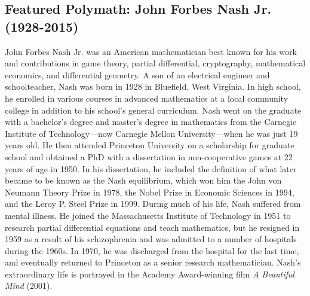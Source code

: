 \documentclass[12pt]{article}
\theoremstyle{definition}
\begin{document}
\subsection*{Featured Polymath: John Forbes Nash Jr. (1928-2015)}
John Forbes Nash Jr. was an American mathematician best known for his work and contributions in game theory, partial differential, cryptography, mathematical economics, and differential geometry. A son of an electrical engineer and schoolteacher, Nash was born in 1928 in Bluefield, West Virginia. In high school, he enrolled in various courses in advanced mathematics at a local community college in addition to his school’s general curriculum. Nash went on the graduate with a bachelor’s degree and master’s degree in mathematics from the Carnegie Institute of Technology—now Carnegie Mellon University—when he was just 19 years old. He then attended Princeton University on a scholarship for graduate school and obtained a PhD with a dissertation in non-cooperative games at 22 years of age in 1950. In his dissertation, he included the definition of what later became to be known as the Nash equilibrium, which won him the John von Neumann Theory Prize in 1978, the Nobel Prize in Economic Sciences in 1994, and the Leroy P. Steel Prize in 1999. During much of his life, Nash suffered from mental illness. He joined the Massachusetts Institute of Technology in 1951 to research partial differential equations and teach mathematics, but he resigned in 1959 as a result of his schizophrenia and was admitted to a number of hospitals during the 1960s. In 1970, he was discharged from the hospital for the last time, and eventually returned to Princeton as a senior research mathematician. Nash’s extraordinary life is portrayed in the Academy Award-winning film \emph{A Beautiful Mind} (2001).
\newpage


\def\currentTitleWallpaper{2021_Pure_Math_Title_Page_Border.pdf}



\newpage



\newpage



\newpage

\def\currentTitleWallpaper{2021_Applied_Math_Title_Page_Border.pdf}
\end{document}
